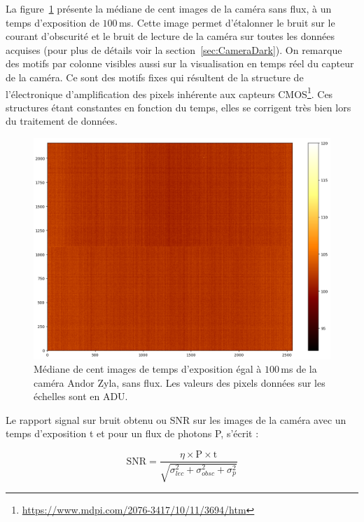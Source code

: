 La figure~\ref{fig:CameraDark} présente la médiane de cent images de la caméra sans flux, à un temps d'exposition de $100 \,$ms. Cette image permet d'étalonner le bruit sur le courant d'obscurité et le bruit de lecture de la caméra sur toutes les données acquises (pour plus de détails voir la section~\ref{sec:CameraDark}). On remarque des motifs par colonne visibles aussi sur la visualisation en temps réel du capteur de la caméra. Ce sont des motifs fixes qui résultent de la structure de l'électronique d'amplification des pixels inhérente aux capteurs \ac{CMOS}\footnote{\url{https://www.mdpi.com/2076-3417/10/11/3694/htm}}. Ces structures étant constantes en fonction du temps, elles se corrigent très bien lors du traitement de données.

\begin{figure}[ht!]
    \centering
    \includegraphics[width=\figwidth]{Figure_Chap3/20220705_DarkFullImage_100ms_24C_median.png}
    \caption[Image sans flux de la caméra Andor Zyla de FIRSTv2.]{Médiane de cent images de temps d'exposition égal à $100 \,$ms de la caméra Andor Zyla, sans flux. Les valeurs des pixels données sur les échelles sont en \ac{ADU}.}
    \label{fig:CameraDark}
\end{figure}

Le rapport signal sur bruit obtenu ou \ac{SNR} sur les images de la caméra avec un temps d'exposition t et pour un flux de photons P, s'écrit :

\begin{equation}
    \text{SNR} = \frac{\eta \times \text{P} \times \text{t}}{\sqrt{\sigma_{lec}^{2} + \sigma_{obsc}^{2} + \sigma_{p}^{2}}}
\end{equation}

